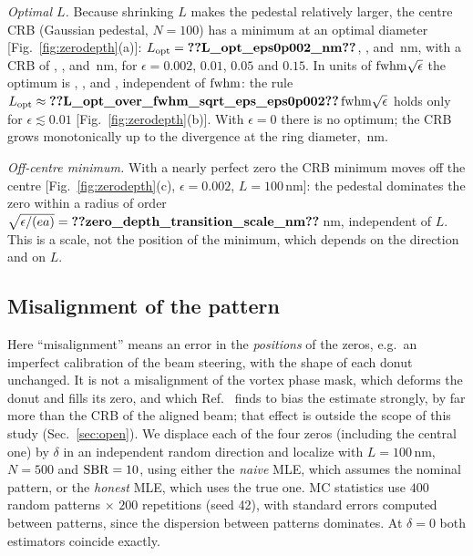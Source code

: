 \emph{Optimal $L$.} Because shrinking $L$ makes the pedestal relatively larger, the centre CRB
(Gaussian pedestal, $N=100$) has a minimum at an optimal diameter [Fig.~\ref{fig:zerodepth}(a)]:
$L_{\mathrm{opt}}=\pnum{L_opt_eps0p002_nm}\src{L_opt_eps0p002_nm}$,
,  and
\,nm, with a CRB of
,
, 
and \,nm, for $\epsilon=0.002$, $0.01$, $0.05$ and
$0.15$. In units of $\mathrm{fwhm}\sqrt\epsilon$ the optimum is
,
,
 and
, independent of
$\mathrm{fwhm}$: the rule $L_{\mathrm{opt}}\approx\pnum{L_opt_over_fwhm_sqrt_eps_eps0p002}\src{L_opt_over_fwhm_sqrt_eps_eps0p002}\,\fwhm\sqrt\epsilon$
holds only for $\epsilon\lesssim0.01$ [Fig.~\ref{fig:zerodepth}(b)]. With $\epsilon=0$ there is no
optimum; the CRB grows monotonically up to the divergence at the ring diameter,
\,nm.

\emph{Off-centre minimum.} With a nearly perfect zero the CRB minimum moves off the centre
[Fig.~\ref{fig:zerodepth}(c), $\epsilon=0.002$, $L=100$\,nm]: the pedestal dominates the zero
within a radius of order $\sqrt{\epsilon/(ea)}=\pnum{zero_depth_transition_scale_nm}\src{zero_depth_transition_scale_nm}$\,nm,
independent of $L$. This is a scale, not the position of the minimum, which depends on the
direction and on $L$.

\subsection{Misalignment of the pattern}
Here ``misalignment'' means an error in the \emph{positions} of the zeros, e.g.\ an imperfect
calibration of the beam steering, with the shape of each donut unchanged. It is not a
misalignment of the vortex phase mask, which deforms the donut and fills its zero, and which
Ref.~\cite{MarinRies2026} finds to bias the estimate strongly, by far more than the CRB of the
aligned beam; that effect is outside the scope of this study
(Sec.~\ref{sec:open}).
We displace each of the four zeros (including the central one) by $\delta$ in an independent
random direction and localize with $L=100$\,nm, $N=500$ and $\mathrm{SBR}=10$, using either the
\emph{naive} MLE, which assumes the nominal pattern, or the \emph{honest} MLE, which uses the
true one. MC statistics use $400$ random patterns $\times$ $200$ repetitions (seed 42), with
standard errors computed between patterns, since the dispersion between patterns dominates. At $\delta=0$ both estimators coincide exactly.

